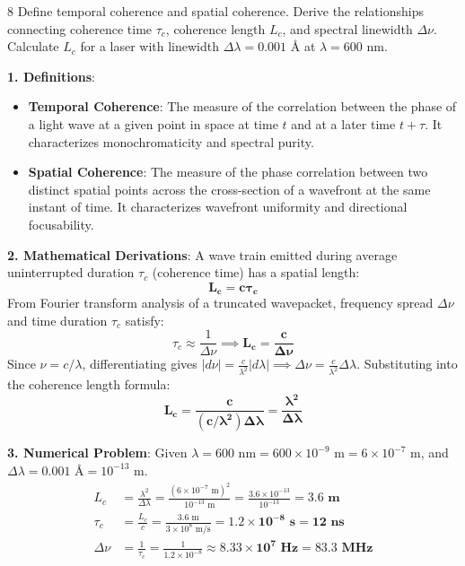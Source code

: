 \begin{theoryq}{8}
Define temporal coherence and spatial coherence. Derive the relationships connecting coherence time $\tau_c$, coherence length $L_c$, and spectral linewidth $\Delta \nu$. Calculate $L_c$ for a laser with linewidth $\Delta \lambda = 0.001\text{ \AA}$ at $\lambda = 600\text{ nm}$.
\end{theoryq}
\begin{theorysol}
\textbf{1. Definitions}:
\begin{itemize}
    \item \textbf{Temporal Coherence}: The measure of the correlation between the phase of a light wave at a given point in space at time $t$ and at a later time $t + \tau$. It characterizes monochromaticity and spectral purity.
    \item \textbf{Spatial Coherence}: The measure of the phase correlation between two distinct spatial points across the cross-section of a wavefront at the same instant of time. It characterizes wavefront uniformity and directional focusability.
\end{itemize}

\textbf{2. Mathematical Derivations}:
A wave train emitted during average uninterrupted duration $\tau_c$ (coherence time) has a spatial length:
\begin{equation}
\mathbf{L_c = c \tau_c}
\end{equation}
From Fourier transform analysis of a truncated wavepacket, frequency spread $\Delta\nu$ and time duration $\tau_c$ satisfy:
\begin{equation}
\tau_c \approx \frac{1}{\Delta \nu} \implies \mathbf{L_c = \frac{c}{\Delta \nu}}
\end{equation}
Since $\nu = c/\lambda$, differentiating gives $|d\nu| = \frac{c}{\lambda^2}|d\lambda| \implies \Delta\nu = \frac{c}{\lambda^2}\Delta\lambda$.
Substituting into the coherence length formula:
\begin{equation}
\mathbf{L_c = \frac{c}{(c/\lambda^2)\Delta\lambda} = \frac{\lambda^2}{\Delta \lambda}}
\end{equation}

\textbf{3. Numerical Problem}:
Given $\lambda = 600\text{ nm} = 600 \times 10^{-9}\text{ m} = 6 \times 10^{-7}\text{ m}$, and $\Delta\lambda = 0.001\text{ \AA} = 10^{-13}\text{ m}$.
\begin{align*}
L_c &= \frac{\lambda^2}{\Delta\lambda} = \frac{(6 \times 10^{-7}\text{ m})^2}{10^{-13}\text{ m}} = \frac{3.6 \times 10^{-13}}{10^{-13}} = \mathbf{3.6\text{ m}} \\
\tau_c &= \frac{L_c}{c} = \frac{3.6\text{ m}}{3 \times 10^8\text{ m/s}} = \mathbf{1.2 \times 10^{-8}\text{ s} = 12\text{ ns}} \\
\Delta\nu &= \frac{1}{\tau_c} = \frac{1}{1.2 \times 10^{-8}} \approx \mathbf{8.33 \times 10^7\text{ Hz} = 83.3\text{ MHz}}
\end{align*}
\end{theorysol}
\vspace{4mm}

